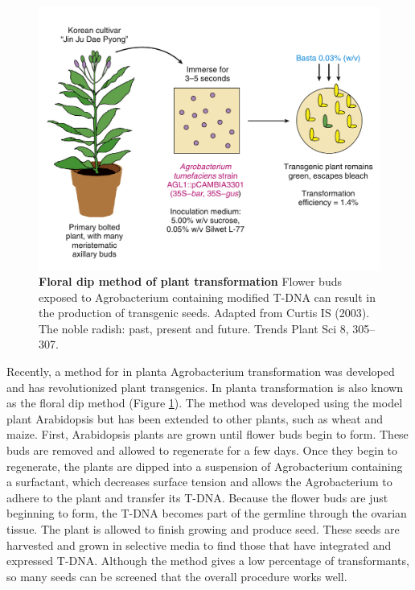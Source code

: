 \documentclass[nofonts,]{tufte-handout}
\begin{document}
\begin{figure}
\includegraphics[width=0.95\linewidth]{./images/agrobacterium_infection_intact} \caption[\textbf{Floral dip method of plant transformation} Flower buds exposed to Agrobacterium containing modified T-DNA can result in the production of transgenic seeds]{\textbf{Floral dip method of plant transformation} Flower buds exposed to Agrobacterium containing modified T-DNA can result in the production of transgenic seeds. Adapted from Curtis IS (2003). The noble radish: past, present and future. Trends Plant Sci 8, 305–307.}\label{fig:agrobacterium-infection-intact}
\end{figure}

Recently, a method for in planta Agrobacterium transformation was
developed and has revolutionized plant transgenics. In planta
transformation is also known as the floral dip method (Figure
\ref{fig:agrobacterium-infection-intact}). The method was developed
using the model plant Arabidopsis but has been extended to other plants,
such as wheat and maize. First, Arabidopsis plants are grown until
flower buds begin to form. These buds are removed and allowed to
regenerate for a few days. Once they begin to regenerate, the plants are
dipped into a suspension of Agrobacterium containing a surfactant, which
decreases surface tension and allows the Agrobacterium to adhere to the
plant and transfer its T-DNA. Because the flower buds are just beginning
to form, the T-DNA becomes part of the germline through the ovarian
tissue. The plant is allowed to finish growing and produce seed. These
seeds are harvested and grown in selective media to find those that have
integrated and expressed T-DNA. Although the method gives a low
percentage of transformants, so many seeds can be screened that the
overall procedure works well.
\end{document}
